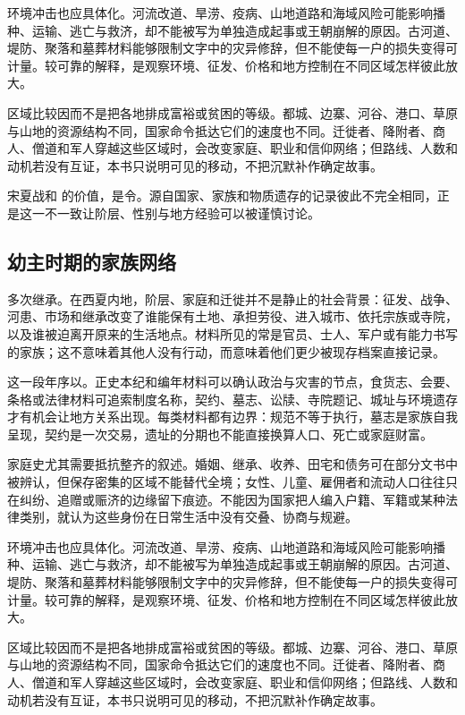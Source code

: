 环境冲击也应具体化。河流改道、旱涝、疫病、山地道路和海域风险可能影响播种、运输、逃亡与救济，却不能被写为单独造成起事或王朝崩解的原因。古河道、堤防、聚落和墓葬材料能够限制文字中的灾异修辞，但不能使每一户的损失变得可计量。较可靠的解释，是观察环境、征发、价格和地方控制在不同区域怎样彼此放大。

区域比较因而不是把各地排成富裕或贫困的等级。都城、边寨、河谷、港口、草原与山地的资源结构不同，国家命令抵达它们的速度也不同。迁徙者、降附者、商人、僧道和军人穿越这些区域时，会改变家庭、职业和信仰网络；但路线、人数和动机若没有互证，本书只说明可见的移动，不把沉默补作确定故事。

宋夏战和 的价值，是令。源自国家、家族和物质遗存的记录彼此不完全相同，正是这一不一致让阶层、性别与地方经验可以被谨慎讨论。

\subsection{幼主时期的家族网络}

多次继承。在西夏内地，阶层、家庭和迁徙并不是静止的社会背景：征发、战争、河患、市场和继承改变了谁能保有土地、承担劳役、进入城市、依托宗族或寺院，以及谁被迫离开原来的生活地点。材料所见的常是官员、士人、军户或有能力书写的家族；这不意味着其他人没有行动，而意味着他们更少被现存档案直接记录。

这一段年序以。正史本纪和编年材料可以确认政治与灾害的节点，食货志、会要、条格或法律材料可追索制度名称，契约、墓志、讼牍、寺院题记、城址与环境遗存才有机会让地方关系出现。每类材料都有边界：规范不等于执行，墓志是家族自我呈现，契约是一次交易，遗址的分期也不能直接换算人口、死亡或家庭财富。

家庭史尤其需要抵抗整齐的叙述。婚姻、继承、收养、田宅和债务可在部分文书中被辨认，但保存密集的区域不能替代全境；女性、儿童、雇佣者和流动人口往往只在纠纷、追赠或赈济的边缘留下痕迹。不能因为国家把人编入户籍、军籍或某种法律类别，就认为这些身份在日常生活中没有交叠、协商与规避。

环境冲击也应具体化。河流改道、旱涝、疫病、山地道路和海域风险可能影响播种、运输、逃亡与救济，却不能被写为单独造成起事或王朝崩解的原因。古河道、堤防、聚落和墓葬材料能够限制文字中的灾异修辞，但不能使每一户的损失变得可计量。较可靠的解释，是观察环境、征发、价格和地方控制在不同区域怎样彼此放大。

区域比较因而不是把各地排成富裕或贫困的等级。都城、边寨、河谷、港口、草原与山地的资源结构不同，国家命令抵达它们的速度也不同。迁徙者、降附者、商人、僧道和军人穿越这些区域时，会改变家庭、职业和信仰网络；但路线、人数和动机若没有互证，本书只说明可见的移动，不把沉默补作确定故事。

